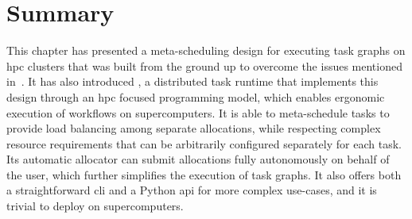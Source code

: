 %

\section*{Summary}
This chapter has presented a meta-scheduling design for executing task graphs on
\gls{hpc} clusters that was built from the ground up to overcome the issues mentioned
in~. It has also introduced \hyperqueue{}, a distributed task
runtime that implements this design through an \gls{hpc} focused programming model,
which enables ergonomic execution of workflows on supercomputers. It is able to meta-schedule tasks
to provide load balancing among separate allocations, while respecting complex resource
requirements that can be arbitrarily configured separately for each task. Its automatic allocator
can submit allocations fully autonomously on behalf of the user, which further simplifies the
execution of \hyperqueue{} task graphs. It also offers both a straightforward
\gls{cli} and a Python \gls{api} for more complex use-cases, and it is
trivial to deploy on supercomputers.

